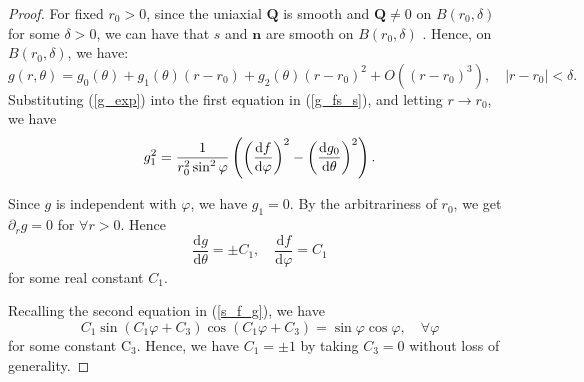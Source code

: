 \documentclass[10pt, a4paper]{article}
\newcommand\dd{\mathrm{d}}
\newcommand\n{\mathbf{n}}
\newcommand\Qvec{\mathbf{Q}}
\newcommand\pp{\partial}
\begin{document}
\begin{proof}
For fixed $r_0 > 0$, since the uniaxial $\Qvec$ is smooth and $\Qvec \neq 0$ on $B(r_0, \delta)$ for some $\delta > 0$, we can have that  $s$ and $\n$ are smooth on $B(r_0, \delta)$ \cite{amaz, lamy2015uniaxial}. Hence, on $B(r_0, \delta)$, we have:
\begin{equation}\label{g_exp}
g(r, \theta) = g_0(\theta) + g_1 (\theta) (r - r_0) + g_2(\theta) (r - r_0)^2 + O((r - r_0)^3), \quad |r - r_0| < \delta.
\end{equation}
Substituting (\ref{g_exp}) into the first equation in (\ref{g_fs_s}), and letting $r \rightarrow r_0$, we have
\begin{equation}
  g_1^2 = \frac{1}{r_0^2 \sin^2 \varphi} \left(\left( \frac{\dd f}{\dd \varphi} \right)^2 - \left( \frac{\dd g_0}{\dd \theta} \right)^2 \right). \\
\end{equation}

Since $g$ is independent with $\varphi$, we have $g_1 = 0$. %
By the arbitrariness of $r_0$, we get $\pp_r g = 0$ for $\forall r > 0$. Hence
\begin{equation}
\frac{\dd g}{\dd \theta} = \pm C_1, \quad \frac{\dd f}{\dd \varphi} =  C_1 %
\end{equation} 
for some real constant $C_1$.

Recalling the second equation in (\ref{s_f_g}), we have
\begin{equation}
 C_1 \sin (C_1 \varphi + C_3) \cos(C_1 \varphi + C_3) = \sin \varphi \cos \varphi, \quad \forall \varphi
\end{equation}
for some constant C$_3$. Hence, we have $C_1 = \pm 1$ by taking $C_3 = 0$ without loss of generality.

\end{proof}
\end{document}
